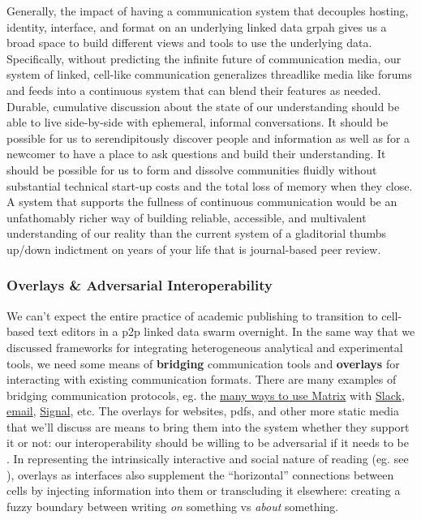 Generally, the impact of having a communication system that decouples
hosting, identity, interface, and format on an underlying linked data
grpah gives us a broad space to build different views and tools to use
the underlying data. Specifically, without predicting the infinite
future of communication media, our system of linked, cell-like
communication generalizes threadlike media like forums and feeds into a
continuous system that can blend their features as needed. Durable,
cumulative discussion about the state of our understanding should be
able to live side-by-side with ephemeral, informal conversations. It
should be possible for us to serendipitously discover people and
information as well as for a newcomer to have a place to ask questions
and build their understanding. It should be possible for us to form and
dissolve communities fluidly without substantial technical start-up
costs and the total loss of memory when they close. A system that
supports the fullness of continuous communication would be an
unfathomably richer way of building reliable, accessible, and
multivalent understanding of our reality than the current system of a
gladitorial thumbs up/down indictment on years of your life that is
journal-based peer review.

\hypertarget{overlays-adversarial-interoperability}{%
\subsubsection{Overlays \& Adversarial
Interoperability}\label{overlays-adversarial-interoperability}}

We can't expect the entire practice of academic publishing to transition
to cell-based text editors in a p2p linked data swarm overnight. In the
same way that we discussed frameworks for integrating heterogeneous
analytical and experimental tools, we need some means of
\textbf{bridging} communication tools and \textbf{overlays} for
interacting with existing communication formats. There are many examples
of bridging communication protocols, eg. the
\href{https://matrix.org/bridges/}{many ways to use Matrix} with
\href{https://matrix.org/bridges/\#slack}{Slack},
\href{https://matrix.org/bridges/\#email}{email},
\href{https://matrix.org/bridges/\#signal}{Signal}, etc. The overlays
for websites, pdfs, and other more static media that we'll discuss are
means to bring them into the system whether they support it or not: our
interoperability should be willing to be adversarial if it needs to be
\citep{doctorowAdversarialInteroperabilityReviving2019, doctorowAdversarialInteroperability2019} . In representing the
intrinsically interactive and social nature of reading (eg. see \citep{jacksonMarginaliaReadersWriting2001} ), overlays as interfaces
also supplement the ``horizontal'' connections between cells by
injecting information into them or transcluding it elsewhere: creating a
fuzzy boundary between writing \emph{on} something vs \emph{about}
something.

